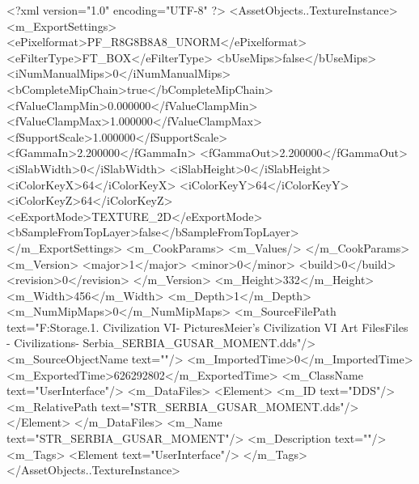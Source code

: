 <?xml version="1.0" encoding="UTF-8" ?>
<AssetObjects..TextureInstance>
	<m_ExportSettings>
		<ePixelformat>PF_R8G8B8A8_UNORM</ePixelformat>
		<eFilterType>FT_BOX</eFilterType>
		<bUseMips>false</bUseMips>
		<iNumManualMips>0</iNumManualMips>
		<bCompleteMipChain>true</bCompleteMipChain>
		<fValueClampMin>0.000000</fValueClampMin>
		<fValueClampMax>1.000000</fValueClampMax>
		<fSupportScale>1.000000</fSupportScale>
		<fGammaIn>2.200000</fGammaIn>
		<fGammaOut>2.200000</fGammaOut>
		<iSlabWidth>0</iSlabWidth>
		<iSlabHeight>0</iSlabHeight>
		<iColorKeyX>64</iColorKeyX>
		<iColorKeyY>64</iColorKeyY>
		<iColorKeyZ>64</iColorKeyZ>
		<eExportMode>TEXTURE_2D</eExportMode>
		<bSampleFromTopLayer>false</bSampleFromTopLayer>
	</m_ExportSettings>
	<m_CookParams>
		<m_Values/>
	</m_CookParams>
	<m_Version>
		<major>1</major>
		<minor>0</minor>
		<build>0</build>
		<revision>0</revision>
	</m_Version>
	<m_Height>332</m_Height>
	<m_Width>456</m_Width>
	<m_Depth>1</m_Depth>
	<m_NumMipMaps>0</m_NumMipMaps>
	<m_SourceFilePath text="F:\Mod Storage\2.1. Civilization VI\Mods\Archive - Pictures\Sid Meier's Civilization VI Art Files\Art Files - Civilizations\Civilization - Serbia\STR_SERBIA_GUSAR_MOMENT.dds"/>
	<m_SourceObjectName text=""/>
	<m_ImportedTime>0</m_ImportedTime>
	<m_ExportedTime>626292802</m_ExportedTime>
	<m_ClassName text="UserInterface"/>
	<m_DataFiles>
		<Element>
			<m_ID text="DDS"/>
			<m_RelativePath text="STR_SERBIA_GUSAR_MOMENT.dds"/>
		</Element>
	</m_DataFiles>
	<m_Name text="STR_SERBIA_GUSAR_MOMENT"/>
	<m_Description text=""/>
	<m_Tags>
		<Element text="UserInterface"/>
	</m_Tags>
</AssetObjects..TextureInstance>

